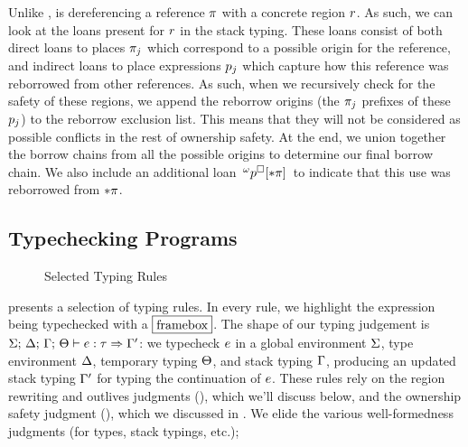 Unlike ,  is dereferencing a reference
$\pi$ with a concrete region $r$. As such, we can look at the loans
present for $r$ in the stack typing. These loans consist of both direct
loans to places $\pi_j$ which correspond to a possible origin for the
reference, and indirect loans to place expressions $p_j$ which
capture how this reference was reborrowed from other references. As such, when
we recursively check for the safety of these regions, we append the reborrow
origins (the $\pi_j$ prefixes of these $p_j$) to the reborrow
exclusion list. This means that they will not be considered as possible
conflicts in the rest of ownership safety. At the end, we union together the
borrow chains from all the possible origins to determine our final borrow chain.
We also include an additional loan
$\,^{\omega} p^\square[* \pi] \,$ to indicate that
this use was reborrowed from $* \pi$.

\subsection{Typechecking \lang Programs}
\label{sec:typechecking}

\begin{figure}
  \figuresize{ \vspace{-0.4em}
    \begin{flushleft}\oxtypjudgeform\end{flushleft}
    \begin{mathpar}
      \TuThreeTwo \and \TMove \and \TCopy \and \TBorrow \and \TLetProv \and
      \TBranch \qquad \TSeq \and \TLet \and \TDrop \and \TAssignDeref \and
      \TAssign \and \TClosure \and \TTuple \and \TWhile \and \TAbort
    \end{mathpar}
  }

  \caption{Selected \lang Typing Rules}
  \label{fig:typing}
\end{figure}

 presents a selection of \lang typing rules. In every rule, we
highlight the expression being typechecked with a $\fbox{framebox}$. The shape
of our typing judgement is $ \Sigma; \, \Delta; \, \Gamma; \, \Theta \vdash  e  : \tau \Rightarrow \Gamma^\prime $: we typecheck $e$ in a
global environment $\Sigma$, type environment $\Delta$, temporary
typing $\Theta$, and stack typing $\Gamma$, producing an updated stack
typing $\Gamma^\prime$ for typing the continuation of $e$. These rules
rely on the region rewriting and outlives judgments (),
which we'll discuss below, and the ownership safety judgment (),
which we discussed in . We elide the various well-formedness
judgments (for types, stack typings, etc.); 

